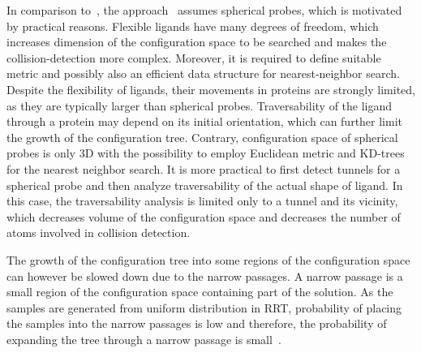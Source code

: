 \documentclass{svmult}
\begin{document}
In comparison to~\cite{guieysse2008structure}, the approach~\cite{vonasek2016application} assumes spherical probes, which is motivated
by practical reasons.
Flexible ligands have many degrees of freedom, which increases dimension of the configuration space to be searched and makes
the collision-detection more complex.
Moreover, it is required to define suitable metric and possibly also an efficient data structure for nearest-neighbor search.
Despite the flexibility of ligands, their movements in proteins are strongly limited, as they are typically larger than spherical
probes.
Traversability of the ligand through a protein may depend on its initial orientation, 
 which can further limit the growth of the configuration tree.
Contrary, configuration space of  spherical probes is only 3D with the possibility to employ Euclidean metric and KD-trees for the
nearest neighbor search.
It is more practical to first detect tunnels for a spherical probe and then analyze traversability of the actual shape of ligand.
In this case, the traversability analysis is limited only to a tunnel and its vicinity, which decreases volume of the configuration space and
decreases the number of atoms involved in collision detection.

The growth of the configuration tree into some regions of the configuration space can however be slowed down due to the narrow passages.
A narrow passage is a small region of the configuration space containing part of the solution.
As the samples are generated from uniform distribution in RRT, probability of placing the samples into the narrow passages is low and therefore,
   the probability of expanding the tree through a narrow passage is small~\cite{hannaWIS}.
\end{document}
